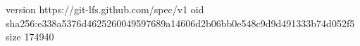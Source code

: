 version https://git-lfs.github.com/spec/v1
oid sha256:e338a5376d4625260049597689a14606d2b06bb0e548c9d9d491333b74d052f5
size 174940
